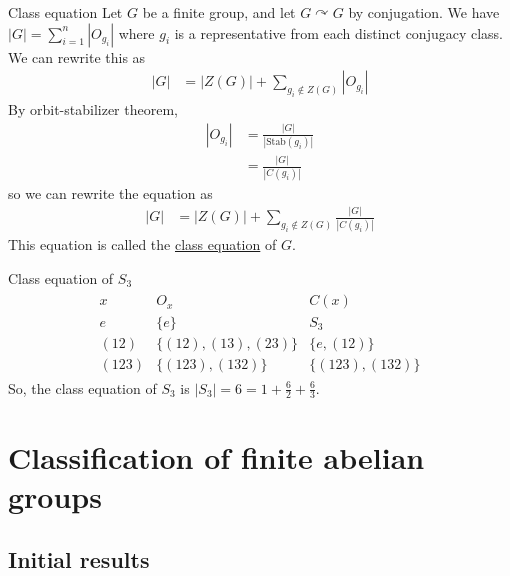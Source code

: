 \documentclass[12pt]{article}
\newcommand{\Stab}{\text{Stab}}
\begin{document}
	\begin{mydef}{Class equation}{}
		Let $G$ be a finite group, and let $G\curvearrowright G$ by conjugation. We have $|G|=\sum_{i=1}^n|O_{g_i}|$ where $g_i$ is a representative from each distinct conjugacy class. We can rewrite this as
		\begin{align*}
			|G|&=|Z(G)|+\sum_{g_i\notin Z(G)}|O_{g_i}|
		\end{align*}
		By orbit-stabilizer theorem,
		\begin{align*}
			|O_{g_i}|&=\frac{|G|}{|\Stab(g_i)|}\\
			&=\frac{|G|}{|C(g_i)|}
		\end{align*}
		so we can rewrite the equation as
		\begin{align*}
			|G|&=|Z(G)|+\sum_{g_i\notin Z(G)}\frac{|G|}{|C(g_i)|}
		\end{align*}
		This equation is called the \underline{class equation} of $G$.
	\end{mydef}
	
	\begin{myex}{Class equation of $S_3$}{}
		\begin{align*}
			\begin{array}{c|c|c}
				x     & O_x                  & C(x)             \\
				\hline
				e     & \{e\}                & S_3              \\
				(12)  & \{(12), (13), (23)\} & \{e, (12)\}      \\
				(123) & \{(123), (132)\}     & \{(123), (132)\}
			\end{array}
		\end{align*}
		So, the class equation of $S_3$ is $|S_3|=6=1+\frac{6}{2}+\frac{6}{3}$.
	\end{myex}
	
	\section{Classification of finite abelian groups}
	\subsection{Initial results}
	
\end{document}
